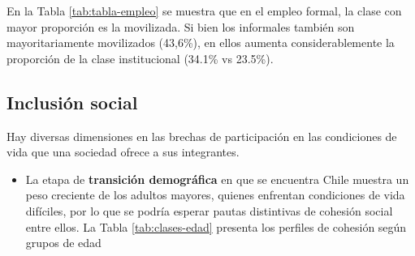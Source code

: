 \documentclass[
  12pt,
]{book}
\providecommand{\tightlist}{%
  \setlength{\itemsep}{0pt}\setlength{\parskip}{0pt}}
\begin{document}
\begin{table}

\caption{\label{tab:tabla-empleo}Efecto del tipo de empleo sobre las clases de cohesion social}
\centering
{}
\end{table}

En la Tabla \ref{tab:tabla-empleo} se muestra que en el empleo formal, la clase con mayor proporción es la movilizada. Si bien los informales también son mayoritariamente movilizados (43,6\%), en ellos aumenta considerablemente la proporción de la clase institucional (34.1\% vs 23.5\%).

\hypertarget{inclusiuxf3n-social}{%
\subsection{Inclusión social}\label{inclusiuxf3n-social}}

Hay diversas dimensiones en las brechas de participación en las condiciones de vida que una sociedad ofrece a sus integrantes.

\begin{itemize}
\tightlist
\item
  La etapa de \textbf{transición demográfica} en que se encuentra Chile muestra un peso creciente de los adultos mayores, quienes enfrentan condiciones de vida difíciles, por lo que se podría esperar pautas distintivas de cohesión social entre ellos. La Tabla \ref{tab:clases-edad} presenta los perfiles de cohesión según grupos de edad
\end{itemize}

\begin{table}

\caption{\label{tab:clases-edad}Efecto de la edad sobre las clases de cohesion social}
\centering
{}
\end{table}
\end{document}
